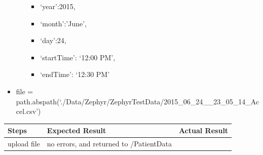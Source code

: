 \documentclass[letterpaper,10pt,english]{sphinxmanual}
\begin{document}
\begin{fulllineitems}
\begin{itemize}
\begin{itemize}
\begin{itemize}
\item {} 
`year':2015,

\item {} 
`month':'June',

\item {} 
`day':24,

\item {} 
`startTime': `12:00 PM',

\item {} 
`endTime': `12:30 PM'

\end{itemize}

\end{itemize}

\item {} 
file = path.abspath(`./Data/Zephyr/ZephyrTestData/2015\_06\_24\_\_23\_05\_14\_Accel.csv')

\end{itemize}

\begin{tabulary}{\linewidth}{|L|L|L|}
\hline
\textsf{\relax 
Steps
} & \textsf{\relax 
Expected Result
} & \textsf{\relax 
Actual Result
}\\
\hline
upload file
 & 
no errors, and returned to /PatientData
 & \\
\hline\end{tabulary}


\end{fulllineitems}

\end{document}
